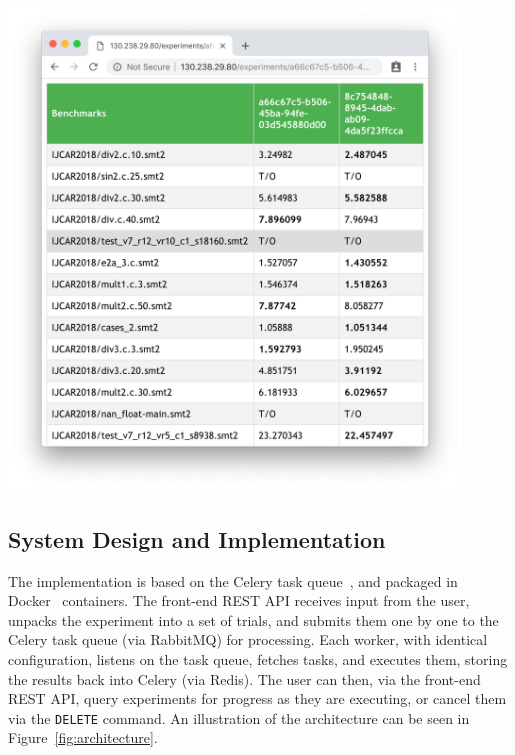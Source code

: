 \documentclass[a4paper]{IEEEtran}
\begin{document}
\begin{Figure}
  \centering \includegraphics[width=0.9\textwidth]{table_view}
  \label{fig:table_view}
\end{Figure}

\subsection{System Design and Implementation}
The implementation is based on the Celery task queue~\cite{celery}, and packaged
in Docker~\cite{docker} containers. The front-end REST API receives input from
the user, unpacks the experiment into a set of trials, and submits them one
by one to the Celery task queue (via RabbitMQ) for processing. Each worker, with
identical configuration, listens on the task queue, fetches tasks, and executes
them, storing the results back into Celery (via Redis). The user can then, via
the front-end REST API, query experiments for progress as they are executing, or
cancel them via the \texttt{DELETE} command. An illustration of the architecture
can be seen in Figure~\ref{fig:architecture}.
\end{document}
